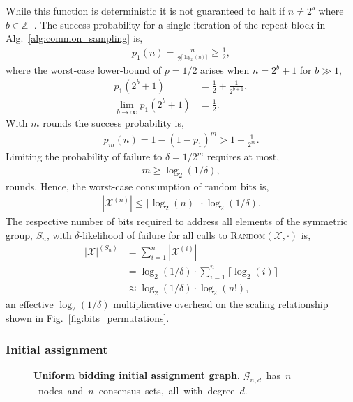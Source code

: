 While this function is deterministic it is not guaranteed to halt if $n\neq 2^b$ where $b\in\mathbb{Z}^+$. The success probability for a single iteration of the repeat block in Alg.~\ref{alg:common_sampling} is,
\begin{align}
	p_1(n) = \frac{n}{2^{\lceil \log_2(n) \rceil}} \geq \frac{1}{2},
\end{align}
where the worst-case lower-bound of $p=1/2$ arises when \mbox{$n=2^b+1$} for \mbox{$b\gg 1$},
\begin{align}
	p_1(2^b+1)                   & = \frac{1}{2} + \frac{1}{2^{b+1}},\nonumber \\
	\lim_{b\to\infty} p_1(2^b+1) & = \frac{1}{2}.
\end{align}
With $m$ rounds the success probability is,
\begin{align}
	p_m(n) = 1-(1-p_1)^m > 1-\frac{1}{2^m}.
\end{align}
Limiting the probability of failure to $\delta=1/2^m$ requires at most,
\begin{align}
	m \geq \log_2(1/\delta),
\end{align}
rounds. Hence, the worst-case consumption of random bits is,
\begin{align}
	|\mathcal{X}^{(n)}| \leq \lceil \log_2(n) \rceil \cdot \log_2(1/\delta).
\end{align}
The respective number of bits required to address all elements of the symmetric group, $S_n$, with $\delta$-likelihood of failure for all calls to \textsc{Random}$(\mathcal{X},\cdot)$ is,
\begin{align}
	|\mathcal{X}|^{(S_n)} & = \sum_{i=1}^n |\mathcal{X}^{(i)}| \nonumber                          \\
	                      & = \log_2(1/\delta) \cdot \sum_{i=1}^n \lceil\log_2(i)\rceil \nonumber \\
	                      & \approx \log_2(1/\delta) \cdot \log_2(n!),
\end{align}
an effective $\log_2(1/\delta)$ multiplicative overhead on the scaling relationship shown in Fig.~\ref{fig:bits_permutations}.

\subsubsection{Initial assignment} \label{sec:initial_graph_assignment}

\begin{figure}[!htb]
	\centering
	
	\caption{\textbf{Uniform bidding initial assignment graph.} \mbox{$\mathcal{G}_{n,d}$ has $n$ nodes and $n$ consensus sets, all with degree $d$.}}\label{fig:butterfly_graph}
\end{figure}

